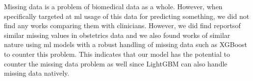 Missing data is a problem of biomedical data as a whole. However, when specifically targeted at \ac{ml} usage of this data for predicting something, we did not find any works comparing them with clinicians. However, we did find reportsof similar missing values in obstetrics data \cite{venkateshMachineLearningStatistical2020} and we also found works of similar nature using \ac{ml} models with a robust handling of missing data such as XGBoost \cite{bitarMachineLearningAlgorithm2023} to counter this problem. This indicates that our model has the potential to counter the missing data problem as well since LightGBM can also handle missing data natively.
